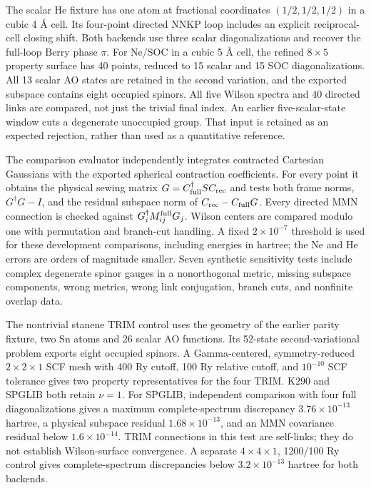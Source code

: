 \documentclass[11pt]{article}
\begin{document}
The scalar He fixture has one atom at fractional coordinates
$(1/2,1/2,1/2)$ in a cubic 4 \AA{} cell. Its four-point directed
NNKP loop includes an explicit reciprocal-cell closing shift.
Both backends use three scalar diagonalizations and recover the
full-loop Berry phase $\pi$. For Ne/SOC in a cubic 5 \AA{} cell,
the refined $8\times5$ property surface has 40 points, reduced to
15 scalar and 15 SOC diagonalizations. All 13 scalar AO states
are retained in the second variation, and the exported subspace
contains eight occupied spinors. All five Wilson spectra and
40 directed links are compared, not just the trivial final index.
An earlier five-scalar-state window cuts a degenerate unoccupied
group. That input is retained as an expected rejection, rather
than used as a quantitative reference.

The comparison evaluator independently integrates contracted
Cartesian Gaussians with the exported spherical contraction
coefficients. For every point it obtains the physical sewing
matrix $G=C_{\rm full}^\dagger S C_{\rm rec}$ and tests both
frame norms, $G^\dagger G-I$, and the residual subspace norm
of $C_{\rm rec}-C_{\rm full}G$. Every directed MMN connection
is checked against $G_i^\dagger M_{ij}^{\rm full}G_j$.
Wilson centers are compared modulo one with permutation and
branch-cut handling. A fixed $2\times10^{-7}$ threshold is used
for these development comparisons, including energies in hartree;
the Ne and He errors are orders of magnitude smaller. Seven
synthetic sensitivity tests include complex degenerate spinor
gauges in a nonorthogonal metric, missing subspace components,
wrong metrics, wrong link conjugation, branch cuts, and
nonfinite overlap data.

The nontrivial stanene TRIM control uses the geometry of the
earlier parity fixture, two Sn atoms and 26 scalar AO functions.
Its 52-state second-variational problem exports eight occupied
spinors. A Gamma-centered, symmetry-reduced $2\times2\times1$
SCF mesh with 400 Ry cutoff, 100 Ry relative cutoff, and
$10^{-10}$ SCF tolerance gives two property representatives
for the four TRIM. K290 and SPGLIB both retain $\nu=1$.
For SPGLIB, independent comparison with four full
diagonalizations gives a maximum complete-spectrum discrepancy
$3.76\times10^{-13}$ hartree, a physical subspace residual
$1.68\times10^{-13}$, and an MMN covariance residual below
$1.6\times10^{-14}$. TRIM connections in this test are
self-links; they do not establish Wilson-surface convergence.
A separate $4\times4\times1$, 1200/100 Ry control gives
complete-spectrum discrepancies below $3.2\times10^{-13}$
hartree for both backends.
\end{document}

